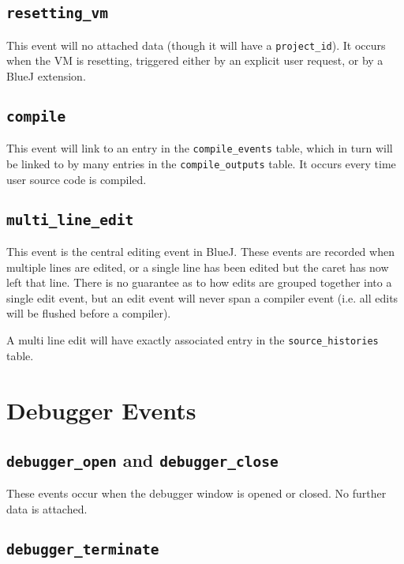 \documentclass{book}
\begin{document}
\subsection{\texttt{resetting\_vm}}

This event will no attached data (though it will have a
\texttt{project\_id}).  It occurs when the VM is resetting, triggered either
by an explicit user request, or by a BlueJ extension.

\subsection{\texttt{compile}}

This event will link to an entry in the \texttt{compile\_events} table, which
in turn will be linked to by many entries in the \texttt{compile\_outputs}
table.  It occurs every time user source code is compiled.

\subsection{\texttt{multi\_line\_edit}}

This event is the central editing event in BlueJ.  These events are recorded
when multiple lines are edited, or a single line has been edited but the caret
has now left that line.  There is no guarantee as to how edits are grouped
together into a single edit event, but an edit event will never span a
compiler event (i.e. all edits will be flushed before a compiler).

A multi line edit will have exactly associated entry in the
\texttt{source\_histories} table.

\section{Debugger Events}


\subsection{\lstinline|debugger_open| and \lstinline|debugger_close|}

These events occur when the debugger window is opened or closed.  No further
data is attached.

\subsection{\lstinline|debugger_terminate|}
\end{document}

